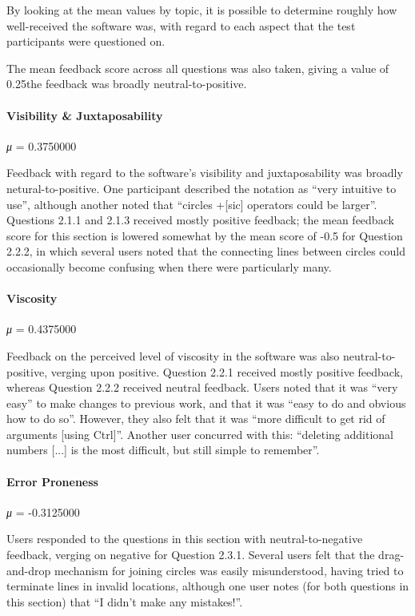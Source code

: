 \documentclass[12pt,twoside,notitlepage,xetex]{report}
\begin{document}
{By looking at the mean values by topic, it is possible to determine roughly how well-received the software was, with regard to each aspect that the test participants were questioned on.

The mean feedback score across all questions was also taken, giving a value of 0.25the feedback was broadly neutral-to-positive.

\paragraph{Visibility \& Juxtaposability}\hfill

\emph{μ} = 0.3750000

Feedback with regard to the software's visibility and juxtaposability was broadly netural-to-positive.  One participant described the notation as ``very intuitive to use'', although another noted that ``circles +[sic] operators could be larger''.  Questions 2.1.1 and 2.1.3 received mostly positive feedback; the mean feedback score for this section is lowered somewhat by the mean score of -0.5 for Question 2.2.2, in which several users noted that the connecting lines between circles could occasionally become confusing when there were particularly many.

\paragraph{Viscosity}\hfill

\emph{μ} = 0.4375000

Feedback on the perceived level of viscosity in the software was also neutral-to-positive, verging upon positive. Question 2.2.1 received mostly positive feedback, whereas Question 2.2.2 received neutral feedback.  Users noted that it was ``very easy'' to make changes to previous work, and that it was ``easy to do and obvious how to do so''.  However, they also felt that it was ``more difficult to get rid of arguments [using Ctrl]''.  Another user concurred with this: ``deleting additional numbers [...] is the most difficult, but still simple to remember''.

\paragraph{Error Proneness}\hfill

\emph{μ} = -0.3125000

Users responded to the questions in this section with neutral-to-negative feedback, verging on negative for Question 2.3.1.  Several users felt that the drag-and-drop mechanism for joining circles was easily misunderstood, having tried to terminate lines in invalid locations, although one user notes (for both questions in this section) that ``I didn't make any mistakes!''.

}
\end{document}
